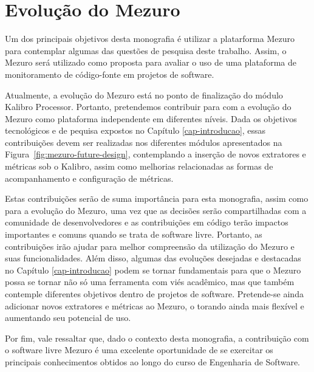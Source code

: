 
%

\section{Evolução do Mezuro}

Um dos principais objetivos desta monografia é utilizar a platarforma Mezuro para contemplar algumas das questões de pesquisa deste trabalho. Assim, o Mezuro será utilizado como proposta para avaliar o uso de uma plataforma de monitoramento de código-fonte em projetos de software. 

%

Atualmente, a evolução do Mezuro está no ponto de finalização do módulo Kalibro Processor. Portanto, pretendemos contribuir para com a evolução do Mezuro como plataforma independente em diferentes níveis. Dada os objetivos tecnológicos e de pequisa expostos no Capítulo \ref{cap-introducao}, essas contribuições devem ser realizadas nos diferentes módulos apresentados na Figura~\ref{fig:mezuro-future-design}, contemplando a inserção de novos extratores e métricas sob o Kalibro, assim como melhorias relacionadas as formas de acompanhamento e configuração de métricas.

%

Estas contribuições serão de suma importância para esta monografia, assim como para a evolução do Mezuro, uma vez que as decisões serão compartilhadas com a comunidade de desenvolvedores e as contribuições em código terão impactos importantes e comuns quando se trata de software livre. Portanto, as contribuições irão ajudar para melhor compreensão da utilização do Mezuro e suas funcionalidades. Além disso, algumas das evoluções desejadas e destacadas no Capítulo \ref{cap-introducao} podem se tornar fundamentais para que o Mezuro possa se tornar não só uma ferramenta com viés acadêmico, mas que também contemple diferentes objetivos dentro de projetos de software. Pretende-se ainda adicionar novos extratores e métricas ao Mezuro, o torando ainda mais flexível e aumentando seu potencial de uso.

%

Por fim, vale ressaltar que, dado o contexto desta monografia, a contribuição com o software livre Mezuro é uma excelente oportunidade de se exercitar os principais conhecimentos obtidos ao longo do curso de Engenharia de Software.

%


